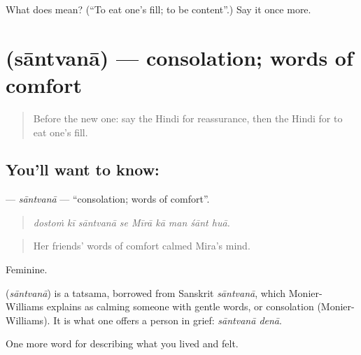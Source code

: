 \begin{tcolorbox}[breakable,colback=teal!4,colframe=teal!35!black,title={Before you move on}]
What does  mean? (\textquotedblleft{}To eat one's fill; to be content\textquotedblright{}.) Say it once more.
\end{tcolorbox}
\section[\texorpdfstring{\hi{सांत्वना} (sāntvanā)}{सांत्वना (sāntvanā)}]{ (sāntvanā) — consolation; words of comfort}

\label{lesson:HI-C463-santvana}



\begin{quote}
Before the new one: say the Hindi for reassurance, then the Hindi for to eat one's fill.
\end{quote}

\subsection*{You'll want to know: }
\textbf{} — \emph{sāntvanā} — \textquotedblleft{}consolation; words of comfort\textquotedblright{}.

\begin{quote}
        
\end{quote}

\begin{quote}
\emph{dostoṁ kī sāntvanā se Mīrā kā man śānt huā.}
\end{quote}

\begin{quote}
Her friends' words of comfort calmed Mira's mind.
\end{quote}

Feminine.

\begin{cousinweb}
\textbf{} (\emph{sāntvanā}) is a tatsama, borrowed from Sanskrit \emph{sāntvanā}, which Monier-Williams explains as calming someone with gentle words, or consolation (Monier-Williams). It is what one offers a person in grief: \emph{sāntvanā denā}.
\end{cousinweb}

\begin{grammarlens}[title={What you've built}]
One more word for describing what you lived and felt.
\end{grammarlens}

